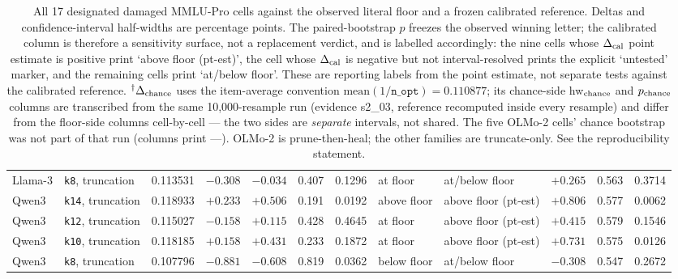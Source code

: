 \begin{table}[H]
{\begin{tabular}{@{}llrrrrrllrrr@{}}
Llama-3 & \texttt{k8}, truncation & 0.113531 & $-0.308$ & $-0.034$ & 0.407 & 0.1296 & at floor & at/below floor & $+0.265$ & 0.563 & 0.3714 \\
Qwen3 & \texttt{k14}, truncation & 0.118933 & $+0.233$ & $+0.506$ & 0.191 & 0.0192 & above floor & above floor (pt-est) & $+0.806$ & 0.577 & 0.0062 \\
Qwen3 & \texttt{k12}, truncation & 0.115027 & $-0.158$ & $+0.115$ & 0.428 & 0.4645 & at floor & above floor (pt-est) & $+0.415$ & 0.579 & 0.1546 \\
Qwen3 & \texttt{k10}, truncation & 0.118185 & $+0.158$ & $+0.431$ & 0.233 & 0.1872 & at floor & above floor (pt-est) & $+0.731$ & 0.575 & 0.0126 \\
Qwen3 & \texttt{k8}, truncation & 0.107796 & $-0.881$ & $-0.608$ & 0.819 & 0.0362 & below floor & at/below floor & $-0.308$ & 0.547 & 0.2672 \\
\bottomrule
\end{tabular}}%
\caption{All 17 designated damaged MMLU-Pro cells against the observed literal
floor and a frozen calibrated reference. Deltas and confidence-interval
half-widths are percentage points. The paired-bootstrap $p$ freezes the observed
winning letter; the calibrated column is therefore a sensitivity surface, not a
replacement verdict, and is labelled accordingly: the nine cells whose $\Delta_{\rm cal}$
point estimate is positive print `above floor (pt-est)', the cell whose $\Delta_{\rm cal}$ is
negative but not interval-resolved prints the explicit `untested' marker, and the
remaining cells print `at/below floor'. These are reporting labels from the point
estimate, not separate tests against the calibrated reference.
$^{\dagger}\Delta_{\rm chance}$ uses the item-average convention
$\mathrm{mean}(1/\texttt{n\_opt})=0.110877$; its chance-side
\mbox{hw$_{\rm chance}$} and \mbox{$p_{\rm chance}$} columns are transcribed from the
same 10{,}000-resample run (evidence \textsf{s2\_03}, reference recomputed inside every
resample) and differ from the floor-side columns cell-by-cell --- the two sides are
\emph{separate} intervals, not shared. The five OLMo-2 cells' chance bootstrap was not
part of that run (columns print ---). OLMo-2 is prune-then-heal; the other families are
truncate-only. See the reproducibility statement.}
\label{tab:mmlupro}
\end{table}
